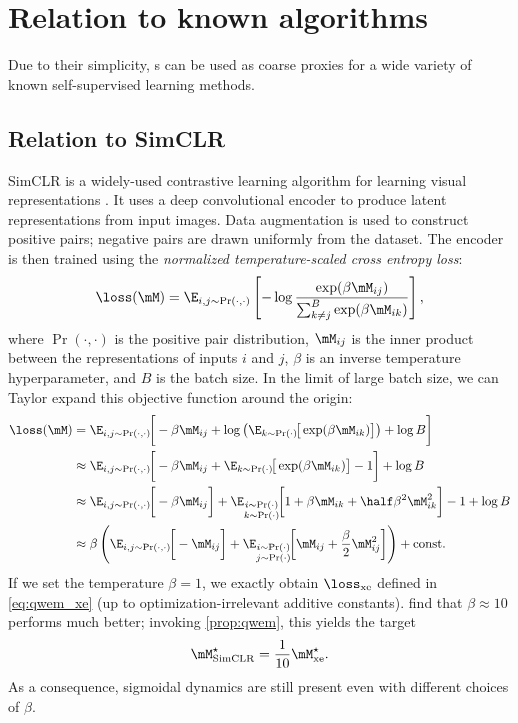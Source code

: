 \section{Relation to known algorithms}
\label{appdx:relation}

Due to their simplicity, \wem s can be used as coarse proxies for a wide variety of known self-supervised learning methods.

\subsection{Relation to SimCLR}

SimCLR is a widely-used contrastive learning algorithm for learning visual representations \citep{chen2020simple}. It uses a deep convolutional encoder to produce latent representations from input images. Data augmentation is used to construct positive pairs; negative pairs are drawn uniformly from the dataset. The encoder is then trained using the \textit{normalized temperature-scaled cross entropy loss}:
\begin{equation}
    \loss(\M) = \E_{i,j\sim \Pr(\cdot,\cdot)} \left[ -\log\frac{\exp(\beta\M_{ij})}{\sum_{k\neq j}^B\exp(\beta\M_{ik})}\right],
\end{equation}
where $\Pr(\cdot,\cdot)$ is the positive pair distribution, $\M_{ij}$ is the inner product between the representations of inputs $i$ and $j$, $\beta$ is an inverse temperature hyperparameter, and $B$ is the batch size. In the limit of large batch size, we can Taylor expand this objective function around the origin:
\begin{align}
    \loss(\M) &= \E_{i,j\sim \Pr(\cdot,\cdot)}\! \bigg[ -\beta\M_{ij} + \log \left(\E_{k\sim \Pr(\cdot)} \!\big[\exp(\beta\M_{ik})\big]\right) + \log B \bigg] \\
    &\approx \E_{i,j\sim \Pr(\cdot,\cdot)} \!\bigg[ -\beta\M_{ij} + \E_{k\sim \Pr(\cdot)} \!\big[\exp(\beta\M_{ik})\big] - 1 \bigg] + \log B \\
    &\approx \E_{i,j\sim \Pr(\cdot,\cdot)}\! \bigg[ -\beta\M_{ij}\bigg] + \E_{\substack{i\sim \Pr(\cdot)\\k\sim \Pr(\cdot)}}\! \bigg[1 + \beta\M_{ik} + \half \beta^2\M_{ik}^2\bigg] - 1 + \log B \\
    &\approx \beta\left(\E_{i,j\sim \Pr(\cdot,\cdot)} \!\bigg[ -\M_{ij}\bigg] + \E_{\substack{i\sim \Pr(\cdot)\\j\sim \Pr(\cdot)}} \!\bigg[\M_{ij} + \frac{\beta}{2} \M_{ij}^2\bigg]\right) + \mathrm{const.}\\
\end{align}
If we set the temperature $\beta=1$, we exactly obtain $\lossxe$ defined in \cref{eq:qwem_xe} (up to optimization-irrelevant additive constants). \cite{chen2020simple} find that $\beta\approx10$ performs much better; invoking \cref{prop:qwem}, this yields the target
\begin{equation}
    \Mstar_\mathrm{SimCLR} = \frac{1}{10} \Mstarxe.
\end{equation}
As a consequence, sigmoidal dynamics are still present even with different choices of $\beta$.

